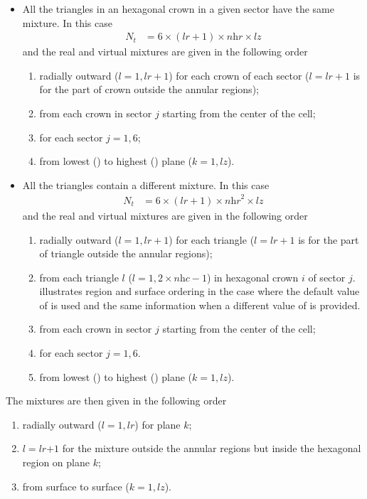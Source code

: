 \begin{itemize}
\begin{itemize}
\item All the triangles in an hexagonal crown in a given sector have the same mixture. In this case
\begin{align*}N_{t}&=6\times (\textit{lr}+1)\times \textit{nhr}\times \textit{lz}\end{align*}
and the real and virtual mixtures are given in the following order 
\begin{enumerate}
\item radially outward ($l=1,\textit{lr}+1$) for each crown of each sector ($l=\textit{lr}+1$ is for the part of crown outside the annular regions);
\item from each crown in sector $j$ starting from the center of the cell;
\item for each sector $j=1,6$;
\item from lowest () to highest () plane ($k=1,\textit{lz}$).
\end{enumerate}

\item All the triangles contain a different mixture. In this case
\begin{align*}N_{t}&=6\times (\textit{lr}+1)\times \textit{nhr}^{2}\times \textit{lz}\end{align*}
and the real and virtual mixtures are given in the following order 
\begin{enumerate}
\item radially outward ($l=1,\textit{lr}+1$) for each triangle ($l=\textit{lr}+1$ is for the part of triangle outside the annular regions);
\item from each triangle $l$ ($l=1,2\times \textit{nhc}-1$) in hexagonal crown $i$ of sector $j$.  illustrates region and surface ordering in the case where the default value of  is used and  the same information when a different value of  is provided.
\item from each crown in sector $j$ starting from the center of the cell;
\item for each sector $j=1,6$.
\item from lowest () to highest () plane ($k=1,\textit{lz}$).
\end{enumerate}
\end{itemize}

\end{itemize}

The mixtures are then given in the following order
\begin{enumerate}
\item radially outward ($l=1,\textit{lr}$) for plane $k$;
\item $l=\textit{lr+1}$ for the mixture outside the annular regions but inside the hexagonal region on plane $k$;
\item from surface  to surface  ($k=1,\textit{lz}$).
\end{enumerate}


